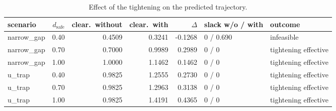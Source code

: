 \begin{table}[htbp]
  \centering
  \small
  \caption{Effect of the tightening on the predicted trajectory.}
  \label{res:tab:robust}
  \begin{tabular}{lrrrrll}
    \toprule
    scenario & $d_{\mathrm{safe}}$ & clear.\ without & clear.\ with & $\Delta$ & slack w/o / with & outcome \\
    \midrule
    narrow\_gap & 0.40 & 0.4509 & 0.3241 & -0.1268 & 0 / 0.690 & infeasible \\
    narrow\_gap & 0.70 & 0.7000 & 0.9989 & 0.2989 & 0 / 0 & tightening effective \\
    narrow\_gap & 1.00 & 1.0000 & 1.1462 & 0.1462 & 0 / 0 & tightening effective \\
    u\_trap & 0.40 & 0.9825 & 1.2555 & 0.2730 & 0 / 0 & tightening effective \\
    u\_trap & 0.70 & 0.9825 & 1.2963 & 0.3138 & 0 / 0 & tightening effective \\
    u\_trap & 1.00 & 0.9825 & 1.4191 & 0.4365 & 0 / 0 & tightening effective \\
    \bottomrule
  \end{tabular}
\end{table}

